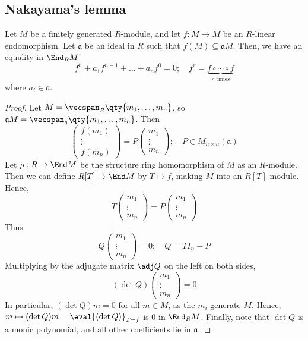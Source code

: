 \subsection{Nakayama's lemma}
\begin{proposition}
    Let \( M \) be a finitely generated \( R \)-module, and let \( f : M \to M \) be an \( R \)-linear endomorphism.
    Let \( \mathfrak a \) be an ideal in \( R \) such that \( f(M) \subseteq \mathfrak a M \).
    Then, we have an equality in \( \End_R M \)
    \[ f^n + a_1 f^{n-1} + \dots + a_n f^0 = 0;\quad f^r = \underbrace{f \circ \cdots \circ f}_{r \text{ times}} \]
    where \( a_i \in \mathfrak a \).
\end{proposition}
\begin{proof}
    Let \( M = \vecspan_R\qty{m_1, \dots, m_n} \), so \( \mathfrak a M = \vecspan_{\mathfrak a} \qty{m_1, \dots, m_n} \).
    Then
    \[ \begin{pmatrix}
        f(m_1) \\
        \vdots \\
        f(m_n)
    \end{pmatrix} = P \begin{pmatrix}
        m_1 \\
        \vdots \\
        m_n
    \end{pmatrix};\quad P \in M_{n \times n}(\mathfrak a) \]
    Let \( \rho : R \to \End M \) be the structure ring homomorphism of \( M \) as an \( R \)-module.
    Then we can define \( R[T] \to \End M \) by \( T \mapsto f \), making \( M \) into an \( R[T] \)-module.
    Hence,
    \[ T \begin{pmatrix}
        m_1 \\
        \vdots \\
        m_n
    \end{pmatrix} = P \begin{pmatrix}
        m_1 \\
        \vdots \\
        m_n
    \end{pmatrix} \]
    Thus
    \[ Q \begin{pmatrix}
        m_1 \\
        \vdots \\
        m_n
    \end{pmatrix} = 0;\quad Q = T I_n - P \]
    Multiplying by the adjugate matrix \( \adj Q \) on the left on both sides,
    \[ (\det Q) \begin{pmatrix}
        m_1 \\
        \vdots \\
        m_n
    \end{pmatrix} = 0 \]
    In particular, \( (\det Q) m = 0 \) for all \( m \in M \), as the \( m_i \) generate \( M \).
    Hence, \( m \mapsto (\det Q) m = \eval{(\det Q)}_{T = f} \) is \( 0 \) in \( \End_R M \).
    Finally, note that \( \det Q \) is a monic polynomial, and all other coefficients lie in \( \mathfrak a \).
\end{proof}
